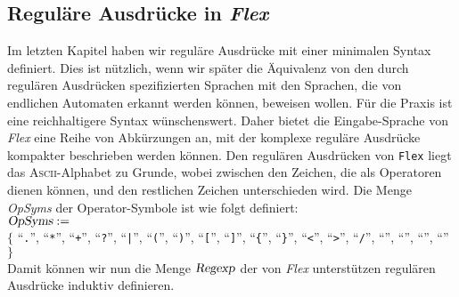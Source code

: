 \subsection{Regul\"are Ausdr\"ucke in \textsl{Flex}}
Im letzten Kapitel haben wir regul\"are Ausdr\"ucke mit einer minimalen Syntax definiert.
Dies ist n\"utzlich, wenn wir sp\"ater die \"Aquivalenz von den durch regul\"aren Ausdr\"ucken spezifizierten
Sprachen mit den Sprachen, die von endlichen Automaten erkannt werden k\"onnen,  beweisen wollen.
F\"ur die Praxis ist eine reichhaltigere Syntax w\"unschenswert.  Daher bietet die Eingabe-Sprache von
\textsl{Flex}\/ eine Reihe von Abk\"urzungen an, mit der komplexe regul\"are Ausdr\"ucke kompakter
beschrieben werden k\"onnen.  Den regul\"aren Ausdr\"ucken von \texttt{Flex} liegt das
\textsc{Ascii}-Alphabet zu Grunde, wobei zwischen den Zeichen, die als Operatoren dienen k\"onnen,
und den restlichen Zeichen unterschieden wird.  Die Menge \textsl{OpSyms}\/ der Operator-Symbole 
ist wie folgt definiert:
\\[0.2cm]
\hspace*{0.1cm}
$\textsl{OpSyms} := $ \\[0.1cm]
\hspace*{0.8cm} 
$\{$ ``\texttt{.}'', 
``\texttt{*}'', 
``\texttt{+}'', 
``\texttt{?}'', 
``\texttt{|}'', 
``\texttt{(}'', 
``\texttt{)}'', 
``\texttt{[}'', 
``\texttt{]}'', 
``\texttt{\{}'', 
``\texttt{\}}'', 
``\texttt{<}'', 
``\texttt{>}'', 
``\texttt{/}'', 
``\texttt{}'', 
``\texttt{}'', 
``\texttt{}'', 
``\texttt{}'' $\}$
\\[0.2cm]
Damit k\"onnen wir nun die Menge $\textsl{Regexp}\/$ der von \textsl{Flex}\/ unterst\"utzen regul\"aren
Ausdr\"ucke induktiv definieren. 
